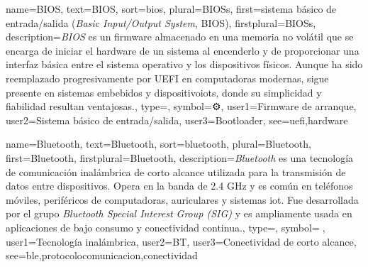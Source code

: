 	
	{
		name={BIOS},
		text={BIOS},
		sort={bios},
		plural={BIOSs},
		first={sistema b{\'a}sico de entrada/salida (\textit{Basic Input/Output System}, BIOS)},
		firstplural={BIOSs},
		description={\emph{BIOS} es un firmware almacenado en una memoria no vol{\'a}til que se encarga de iniciar el \gls{hardware} de un sistema al encenderlo y de proporcionar una interfaz b{\'a}sica entre el sistema operativo y los \glspl{dispositivo} f{\'i}sicos. Aunque ha sido reemplazado progresivamente por UEFI en computadoras modernas, sigue presente en sistemas embebidos y \glspl{dispositivoiot}, donde su simplicidad y fiabilidad resultan ventajosas.},
		type=\glsdefaulttype,
		symbol={⚙️},
		user1={Firmware de arranque},
		user2={Sistema b{\'a}sico de entrada/salida},
		user3={Bootloader},
		see={uefi,hardware}
	}
	
	{
		name={Bluetooth},
		text={Bluetooth},
		sort={bluetooth},
		plural={Bluetooth},
		first={Bluetooth},
		firstplural={Bluetooth},
		description={\emph{Bluetooth} es una tecnolog{\'i}a de comunicaci{\'o}n inal{\'a}mbrica de corto alcance utilizada para la transmisi{\'o}n de datos entre \glspl{dispositivo}. Opera en la banda de 2.4 GHz y es com{\'u}n en tel{\'e}fonos m{\'o}viles, perif{\'e}ricos de computadoras, auriculares y sistemas \gls{iot}. Fue desarrollada por el grupo \textit{Bluetooth Special Interest Group (SIG)} y es ampliamente usada en aplicaciones de bajo consumo y conectividad continua.},
		type=\glsdefaulttype,
		symbol={🔵},
		user1={Tecnolog{\'i}a inal{\'a}mbrica},
		user2={BT},
		user3={Conectividad de corto alcance},
		see={ble,protocolocomunicacion,conectividad}
	}
	
